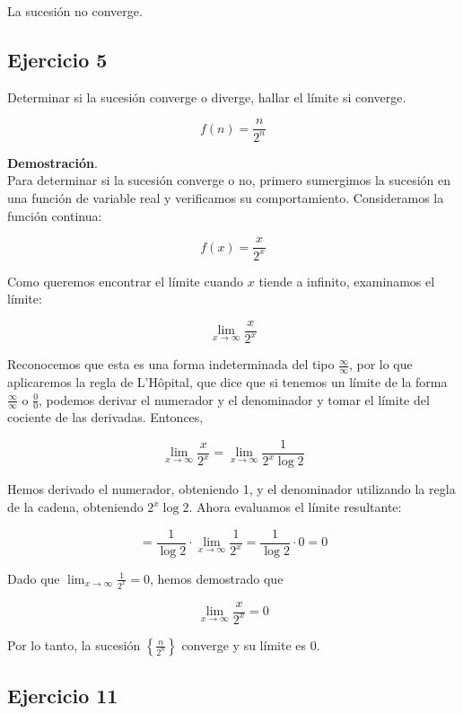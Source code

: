 \documentclass{article}
\begin{document}
    La sucesión no converge.

    \subsection*{Ejercicio 5}

    Determinar si la sucesión converge o diverge, hallar el límite si converge.

    $$
    f(n)=\frac{n}{2^{n}}
    $$

    \textbf{Demostración}.\\

    Para determinar si la sucesión converge o no, primero sumergimos la sucesión en una función de variable real y verificamos su comportamiento. Consideramos la función continua:

    $$
    f(x)=\frac{x}{2^{x}}
    $$

    Como queremos encontrar el límite cuando \( x \) tiende a infinito, examinamos el límite:

    $$
    \lim _{x \rightarrow \infty} \frac{x}{2^{x}}
    $$

    Reconocemos que esta es una forma indeterminada del tipo \(\frac{\infty}{\infty}\), por lo que aplicaremos la regla de L'Hôpital, que dice que si tenemos un límite de la forma \(\frac{\infty}{\infty}\) o \(\frac{0}{0}\), podemos derivar el numerador y el denominador y tomar el límite del cociente de las derivadas. Entonces,

    $$
    \lim _{x \rightarrow \infty} \frac{x}{2^{x}} = \lim _{x \rightarrow \infty} \frac{1}{2^{x} \log 2}
    $$

    Hemos derivado el numerador, obteniendo 1, y el denominador utilizando la regla de la cadena, obteniendo \(2^x \log 2\). Ahora evaluamos el límite resultante:

    $$
    = \frac{1}{\log 2} \cdot \lim _{x \rightarrow \infty} \frac{1}{2^{x}} = \frac{1}{\log 2} \cdot 0 = 0
    $$

    Dado que \( \lim _{x \rightarrow \infty} \frac{1}{2^{x}} = 0 \), hemos demostrado que

    $$
    \lim _{x \rightarrow \infty} \frac{x}{2^{x}} = 0
    $$

    Por lo tanto, la sucesión \( \left\{ \frac{n}{2^n} \right\} \) converge y su límite es 0.

    \subsection*{Ejercicio 11}
\end{document}

